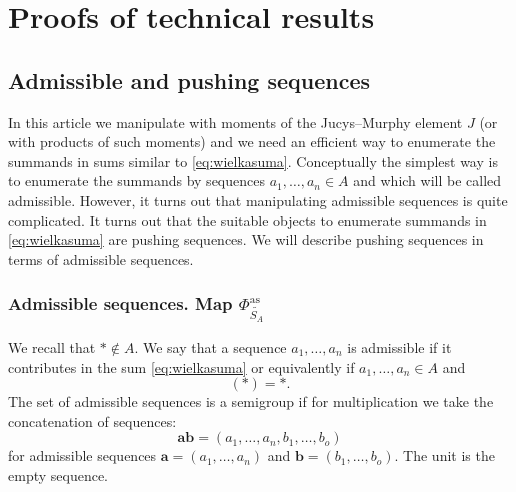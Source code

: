 \documentclass[12pt,dvips]{amsart}
\numberwithin{equation}{section} \numberwithin{figure}{section}
\theoremstyle{plain}
\theoremstyle{definition}
\newtheorem*{definition}{Definition}
\theoremstyle{remark}
\newcommand{\aaa}{{\mathbf{a}}}
\newcommand{\bbb}{{\mathbf{b}}}
\newcommand{\Sn}[1]{{{S}}_{#1}}
\newcommand{\xtra}{\ast}
\newcommand{\cytat}[1]{}
\newcommand{\fass}{\Phi^{\adm}_{\PartPerm{A}}}
\newcommand{\PartPerm}[1]{\widetilde{\Sn{#1}}}
\DeclareMathOperator{\adm}{as}
\begin{document}
%



%




\section{Proofs of technical results}
\label{sec:proofs}

\cytat{
\begin{quotation}
Czucie i wiara silniej m\'owi do mnie ni\.z m\c{e}drca szkie\l{}ko i
oko.
\\
\textsc{Adam Mickiewicz, `Romantyczno\'s\'c'}
\end{quotation}
}

\subsection{Admissible and pushing sequences}
In this article we manipulate with moments of the Jucys--Murphy
element $J$ (or with products of such moments) and we need an
efficient way to enumerate the summands in sums similar to
\eqref{eq:wielkasuma}. Conceptually the simplest way is to enumerate
the summands by sequences $a_1,\dots,a_n\in A$ and which will be
called admissible. However, it turns out that manipulating
admissible sequences is quite complicated. It turns out that the
suitable objects to enumerate summands in \eqref{eq:wielkasuma} are
pushing sequences. We will describe pushing sequences in terms of
admissible sequences.


\subsubsection{Admissible sequences. Map $\fass$}
We recall that $\xtra\notin A$. We say that a sequence
$a_1,\dots,a_n$ is admissible 
 if it contributes in the sum
\eqref{eq:wielkasuma} or equivalently if $a_1,\dots,a_n\in A$ and
\begin{equation}
[(a_1 \xtra) \cdots (a_n \xtra)](\xtra)=\xtra. \label{eq:admissible}
\end{equation}
The set of admissible sequences is a semigroup if for multiplication
we take the concatenation of sequences:
$$\aaa \bbb=(a_1,\dots,a_n,b_1,\dots,b_o)$$
for admissible sequences $\aaa=(a_1,\dots,a_n)$ and
$\bbb=(b_1,\dots,b_o)$. The unit is the empty sequence.
\end{document}
